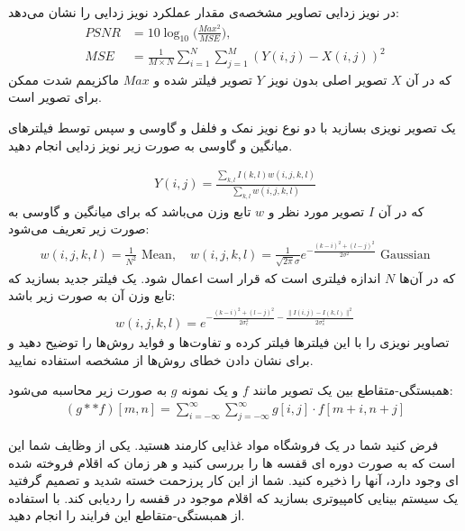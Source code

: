 \documentclass[11pt,professionalfonts]{article}
\begin{document}
	
	
	در نویز زدایی تصاویر مشخصه‌ی مقدار 
	عملکرد نویز زدایی را نشان می‌دهد:
	\begin{align*}
		PSNR &= 10\log_{10}\bigg(\frac{Max^{2}}{MSE}\bigg),\\
		MSE &= \frac{1}{M\times N}\sum\limits_{i=1}^{N}\sum\limits_{j=1}^{M} (Y(i,j)-X(i,j))^{2}
	\end{align*}
	که در آن 
	$X$
	تصویر اصلی بدون نویز
	$Y$
	تصویر فیلتر شده و 
	$Max$
	ماکزیمم شدت ممکن برای تصویر است.
	
	
	یک تصویر نویزی بسازید با دو نوع نویز نمک و فلفل و گاوسی و سپس توسط فیلترهای میانگین و گاوسی به صورت زیر نویز زدایی انجام دهید.
	
	\begin{align*}
		Y(i,j) = \frac{\sum\limits_{k,l}I(k,l)w(i,j,k,l)}{\sum\limits_{k,l}w(i,j,k,l)}
	\end{align*}
	که در آن 
	$I$
	تصویر مورد نظر و 
	$w$
	تابع وزن می‌باشد که برای میانگین و گاوسی به صورت زیر تعریف می‌شود:
	\begin{align*}
		w(i,j,k,l)  = \frac{1}{N^{2}} \,\, \text{Mean},\quad w(i,j,k,l) = \frac{1}{\sqrt{2\pi}\sigma}e^{-\frac{(k-i)^{2}+(l-j)^{2}}{2\sigma^{2}}}\,\,\text{Gaussian}
	\end{align*}
	که در آن‌ها 
	$N$
	اندازه فیلتری است که قرار است اعمال شود. یک فیلتر جدید بسازید که تابع وزن آن به صورت زیر باشد:
	\begin{align*}
		w(i,j,k,l) = e^{-\frac{(k-i)^{2}+(l-j)^{2}}{2\sigma_c^{2}} - \frac{\|I(i,j)-I(k,l)\|^{2}}{2\sigma_s^{2}}}
	\end{align*}
	تصاویر نویزی را با این فیلترها فیلتر کرده و تفاوت‌ها و فواید روش‌ها را توضیح دهید و برای نشان دادن خطای روش‌ها از مشخصه 
	استفاده نمایید.
	
	
	
	همبستگی-متقاطع بین یک تصویر مانند 
	$f$
	و یک نمونه
	$g$
	به صورت زیر محاسبه می‌شود:
	\begin{align*}
		(g ** f)[m,n]=\sum_{i=-\infty}^\infty\sum_{j=-\infty}^\infty g[i,j]\cdot f[m + i,n + j]
	\end{align*}
	
	فرض کنید شما در یک فروشگاه مواد غذایی کارمند هستید. یکی از وظایف شما این است که به صورت دوره ای قفسه ها را بررسی کنید و هر زمان که اقلام فروخته شده ای وجود دارد، آنها را ذخیره کنید. شما از این کار پرزحمت خسته شدید و تصمیم گرفتید یک سیستم بینایی کامپیوتری بسازید که اقلام موجود در قفسه را ردیابی کند. با استفاده از همبستگی-متقاطع این فرایند را انجام دهید.
	
\end{document}
